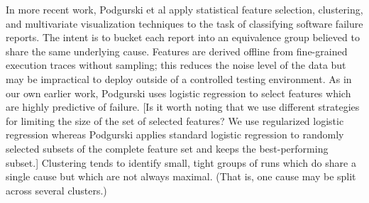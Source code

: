 \documentclass{acm_proc_article-sp}
\newcommand{\placeholder}[1]{{\color[cmyk]{0,0.61,0.87,0}[#1]}}
\begin{document}
In more recent work, Podgurski et al \cite{ICSE`03*465} apply
statistical feature selection, clustering, and multivariate
visualization techniques to the task of classifying software failure
reports.  The intent is to bucket each report into an equivalence
group believed to share the same underlying cause.  Features are
derived offline from fine-grained execution traces without sampling;
this reduces the noise level of the data but may be impractical to
deploy outside of a controlled testing environment.  As in our own
earlier work, Podgurski uses logistic regression to select features
which are highly predictive of failure.  \placeholder{Is it worth
  noting that we use different strategies for limiting the size of the
  set of selected features?  We use regularized logistic regression
  whereas Podgurski applies standard logistic regression to randomly
  selected subsets of the complete feature set and keeps the
  best-performing subset.}  Clustering tends to identify small, tight
groups of runs which do share a single cause but which are not always
maximal.  (That is, one cause may be split across several clusters.)
\end{document}
